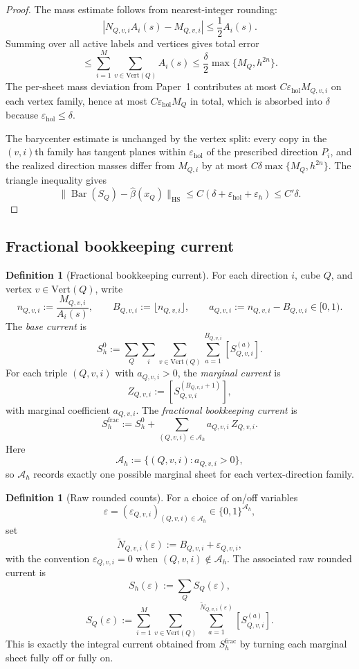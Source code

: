 \documentclass[11pt]{article}
\numberwithin{equation}{section}
\theoremstyle{plain}
\theoremstyle{definition}
\newtheorem{definition}[theorem]{Definition}
\theoremstyle{remark}
\DeclareMathOperator{\HS}{HS}
\newcommand{\eps}{\varepsilon}
\newcommand{\calA}{\mathcal{A}}
\newcommand{\Bary}{\operatorname{Bar}}
\begin{document}
\begin{proof}
The mass estimate follows from nearest-integer rounding:
\[
|N_{Q,v,i}A_i(s)-M_{Q,v,i}|\le \frac12 A_i(s).
\]
Summing over all active labels and vertices gives total error
\[
\le \sum_{i=1}^M\sum_{v\in\mathrm{Vert}(Q)} A_i(s)\le \frac\delta2\max\{M_Q,h^{2n}\}.
\]
The per-sheet mass deviation from Paper~1 contributes at most $C\eps_{\mathrm{hol}}M_{Q,v,i}$ on each vertex family, hence at most $C\eps_{\mathrm{hol}}M_Q$ in total, which is absorbed into $\delta$ because $\eps_{\mathrm{hol}}\le\delta$.

The barycenter estimate is unchanged by the vertex split: every copy in the $(v,i)$th family has tangent planes within $\eps_{\mathrm{hol}}$ of the prescribed direction $P_i$, and the realized direction masses differ from $M_{Q,i}$ by at most $C\delta\max\{M_Q,h^{2n}\}$.  The triangle inequality gives
\[
\|\Bary(S_Q)-\widehat\beta(x_Q)\|_{\HS}\le C(\delta+\eps_{\mathrm{hol}}+\eps_h)\le C'\delta.
\]
\end{proof}

\subsection{Fractional bookkeeping current}

\begin{definition}[Fractional bookkeeping current]\label{def:fractional}
For each direction $i$, cube $Q$, and vertex $v\in\mathrm{Vert}(Q)$, write
\[
n_{Q,v,i}:=\frac{M_{Q,v,i}}{A_i(s)},
\qquad
B_{Q,v,i}:=\lfloor n_{Q,v,i}\rfloor,
\qquad
a_{Q,v,i}:=n_{Q,v,i}-B_{Q,v,i}\in[0,1).
\]
The \emph{base current} is
\[
S_h^0:=\sum_{Q}\sum_{i}\sum_{v\in\mathrm{Vert}(Q)}\sum_{a=1}^{B_{Q,v,i}} [S_{Q,v,i}^{(a)}].
\]
For each triple $(Q,v,i)$ with $a_{Q,v,i}>0$, the \emph{marginal current} is
\[
Z_{Q,v,i}:=[S_{Q,v,i}^{(B_{Q,v,i}+1)}],
\]
with marginal coefficient $a_{Q,v,i}$.  The \emph{fractional bookkeeping current} is
\[
S_h^{\mathrm{frac}}:=S_h^0+\sum_{(Q,v,i)\in\calA_h} a_{Q,v,i}\,Z_{Q,v,i}.
\]
Here
\[
\calA_h:=\{(Q,v,i):a_{Q,v,i}>0\},
\]
so $\calA_h$ records exactly one possible marginal sheet for each vertex-direction family.
\end{definition}

\begin{definition}[Raw rounded counts]\label{def:rounded-counts}
For a choice of on/off variables
\[
\varepsilon=(\varepsilon_{Q,v,i})_{(Q,v,i)\in\calA_h}\in\{0,1\}^{\calA_h},
\]
set
\[
\widetilde N_{Q,v,i}(\varepsilon):=B_{Q,v,i}+\varepsilon_{Q,v,i},
\]
with the convention $\varepsilon_{Q,v,i}=0$ when $(Q,v,i)\notin\calA_h$.  The associated raw rounded current is
\[
S_h(\varepsilon):=\sum_Q S_Q(\varepsilon),
\]
\[
S_Q(\varepsilon):=\sum_{i=1}^M\sum_{v\in\mathrm{Vert}(Q)}\sum_{a=1}^{\widetilde N_{Q,v,i}(\varepsilon)} [S_{Q,v,i}^{(a)}].
\]
This is exactly the integral current obtained from $S_h^{\mathrm{frac}}$ by turning each marginal sheet fully off or fully on.
\end{definition}
\end{document}
